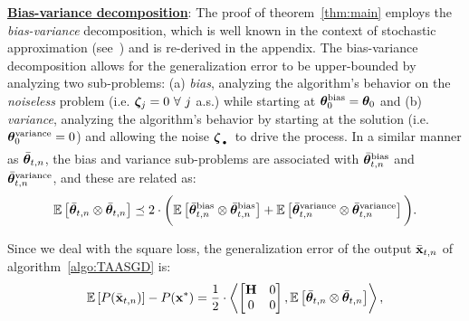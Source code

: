 \vspace{-0.2cm}
\noindent \underline{\textbf{Bias-variance decomposition}}: The proof of theorem~\ref{thm:main} employs the {\em bias-variance} decomposition, which is well known in the context of stochastic approximation (see~\cite{BachM11,FrostigGKS15,JainKKNS16}) and is re-derived in the appendix. The bias-variance decomposition allows for the generalization error to be upper-bounded by analyzing two sub-problems: (a) {\em bias}, analyzing the algorithm's behavior on the {\em noiseless} problem (i.e. $\boldsymbol{\zeta}_j=0\ \forall\ j$ a.s.) while starting at $\boldsymbol{\theta}_0^{\textrm{bias}}=\boldsymbol{\theta}_0$ and (b) {\em variance}, analyzing the algorithm's behavior by starting at the solution (i.e. $\boldsymbol{\theta}_0^{\textrm{variance}}=0$) and allowing the noise $\zetav_{\Bigcdot}$ to drive the process. In a similar manner as ${\bar{\boldsymbol{\theta}}}_{t,n}$, the bias and variance sub-problems are associated with ${\bar{\boldsymbol{\theta}}}_{t,n}^{\textrm{bias}}$ and ${\bar{\boldsymbol{\theta}}}_{t,n}^{\textrm{variance}}$, and these are related as:\vspace*{-2mm}
\begin{align}\label{eqn:bound-covar}
		\mathbb{E}\left[{\bar{\boldsymbol{\theta}}}_{t,n} \otimes {\bar{\boldsymbol{\theta}}}_{t,n}\right] \preceq 2\cdot\bigg( \mathbb{E}\left[{\bar{\boldsymbol{\theta}}}_{t,n}^{\text{bias}} \otimes {\bar{\boldsymbol{\theta}}}_{t,n}^{\text{bias}}\right] + \mathbb{E}\left[{\bar{\boldsymbol{\theta}}}_{t,n}^{\text{variance}} \otimes {\bar{\boldsymbol{\theta}}}_{t,n}^{\text{variance}}\right]\bigg).
\end{align}

\vspace{-0.2cm}
\noindent Since we deal with the square loss, the generalization error of the output $\bar{\mathbf{x}}_{t,n}$ of algorithm~\ref{algo:TAASGD} is:\vspace*{-2mm}
\begin{align}
\label{eq:genErrorExp}
\mathbb{E}\left[P(\bar{\mathbf{x}}_{t,n})\right]-P(\mathbf{x}^*)=\frac{1}{2}\cdot\left\langle \begin{bmatrix}\mathbf{H}&0\\0&0\end{bmatrix}, \mathbb{E}\left[{\bar{\boldsymbol{\theta}}}_{t,n} \otimes {\bar{\boldsymbol{\theta}}}_{t,n}\right] \right\rangle,
\end{align}

